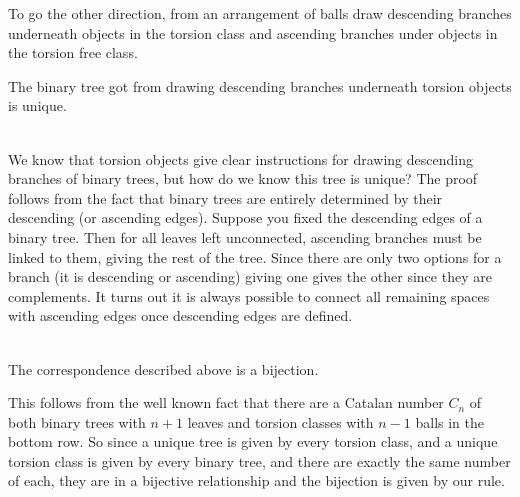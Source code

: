 \documentclass{article}
\begin{document}
To go the other direction, from an arrangement of balls draw descending branches underneath objects in the torsion class and ascending branches under objects in the torsion free class. \\
\begin{thm}
The binary tree got from drawing descending branches underneath torsion objects is unique. 
\end{thm}




\\
 We know that torsion objects give clear instructions for drawing descending branches of binary trees, but how do we know this tree is unique? The proof follows from the fact that binary trees are entirely determined by their descending (or ascending edges). Suppose you fixed the descending edges of a binary tree. Then for all leaves left unconnected, ascending branches must be linked to them, giving the rest of the tree. Since there are only two options for a branch (it is descending or ascending) giving one gives the other since they are complements. It turns out it is always possible to connect all remaining spaces with ascending edges once descending edges are defined. \\
\\

\begin{thm}
The correspondence described above is a bijection.
\end{thm}
 This follows from the well known fact that there are a Catalan number $C_n$ of both binary trees with $n+1$ leaves and torsion classes with $n-1$ balls in the bottom row. So since a unique tree is given by every torsion class, and a unique torsion class is given by every binary tree, and there are exactly the same number of each, they are in a bijective relationship and the bijection is given by our rule. \\

\\

 
 
 
\end{document}
